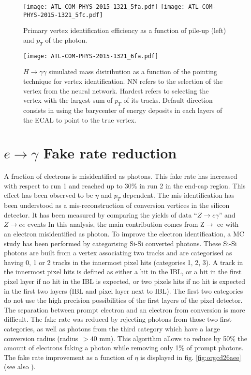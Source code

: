 \begin{figure}
  \centering
  \texttt{[image: ATL-COM-PHYS-2015-1321\_5fa.pdf]}
  \texttt{[image: ATL-COM-PHYS-2015-1321\_5fc.pdf]}
  \caption{Primary vertex identification efficiency as a function of pile-up (left) and $p_T$ of the photon.\cite{ATL-COM-PHYS-2015-1321}}
  \label{fig:Calibration_RecoID_NNPointingEff}
\end{figure}

\begin{figure}
  \centering
  \texttt{[image: ATL-COM-PHYS-2015-1321\_6fa.pdf]}
  \caption{$H\rightarrow\gamma\gamma$ simulated mass distribution as a function of the pointing technique for vertex identification.
    NN refers to the selection of the vertex from the neural network.
    Hardest refers to selecting the vertex with the largest sum of $p_T$ of its tracks.
    Default direction consists in using the barycenter of energy deposits in each layers of the ECAL to point to the true vertex.
    \cite{ATL-COM-PHYS-2015-1321}}
  \label{fig:Calibration_RecoID_NNPointingMass}
\end{figure}


\section{\(e\rightarrow\gamma\) Fake rate reduction}
\label{sec:org846d203}
A fraction of electrons is misidentified as photons.
This fake rate has increased with respect to run 1 and reached up to 30\% in run 2 in the end-cap region.
This effect has been observed to be $\eta$ and $p_T$ dependent.
The mis-identification has been understood as a mis-reconstruction of conversion vertices in the silicon detector.
It has been measured by comparing the yields of data ``$Z\rightarrow e\gamma$'' and \(Z\rightarrow ee\) events
In this analysis, the main contribution comes from Z\(\rightarrow\) ee with an electron misidentified as photon.
To improve the electron identification, a MC study has been performed by categorising Si-Si converted photons.
These Si-Si photons are built from a vertex associating two tracks and are categorised as having 0, 1 or 2 tracks in the innermost pixel hits (categories 1, 2, 3).
A track in the innermost pixel hits is defined as either a hit in the IBL, or a hit in the first pixel layer if no hit in the IBL is expected, or two pixels hits if no hit is expected in the first two layers (IBL and pixel layer next to IBL).
The first two categories do not use the high precision possibilities of the first layers of the pixel detector.
The separation between prompt electron and an electron from conversion is more difficult.
The fake rate was reduced by rejecting photons from those two first categories, as well as photons from the third category which have a large conversion radius (radius~$>40$ mm).
This algorithm allows to reduce by 50\% the amount of electrons faking a photon while removing only 1\% of prompt photons.
The fake rate improvement as a function of $\eta$ is displayed in fig. \ref{fig:orgcd26aee} (see also \cite{ATL-COM-PHYS-2016-575} ).


